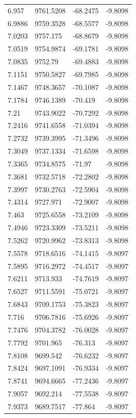 \begin{table}[H]
\begin{tabular}{llll}
6.957 & 9761.5208 & -68.2475 & -9.8098 \\
6.9886 & 9759.3528 & -68.5577 & -9.8098 \\
7.0203 & 9757.175 & -68.8679 & -9.8098 \\
7.0519 & 9754.9874 & -69.1781 & -9.8098 \\
7.0835 & 9752.79 & -69.4883 & -9.8098 \\
7.1151 & 9750.5827 & -69.7985 & -9.8098 \\
7.1467 & 9748.3657 & -70.1087 & -9.8098 \\
7.1784 & 9746.1389 & -70.419 & -9.8098 \\
7.21 & 9743.9022 & -70.7292 & -9.8098 \\
7.2416 & 9741.6558 & -71.0394 & -9.8098 \\
7.2732 & 9739.3995 & -71.3496 & -9.8098 \\
7.3049 & 9737.1334 & -71.6598 & -9.8098 \\
7.3365 & 9734.8575 & -71.97 & -9.8098 \\
7.3681 & 9732.5718 & -72.2802 & -9.8098 \\
7.3997 & 9730.2763 & -72.5904 & -9.8098 \\
7.4314 & 9727.971 & -72.9007 & -9.8098 \\
7.463 & 9725.6558 & -73.2109 & -9.8098 \\
7.4946 & 9723.3309 & -73.5211 & -9.8098 \\
7.5262 & 9720.9962 & -73.8313 & -9.8098 \\
7.5578 & 9718.6516 & -74.1415 & -9.8097 \\
7.5895 & 9716.2972 & -74.4517 & -9.8097 \\
7.6211 & 9713.933 & -74.7619 & -9.8097 \\
7.6527 & 9711.5591 & -75.0721 & -9.8097 \\
7.6843 & 9709.1753 & -75.3823 & -9.8097 \\
7.716 & 9706.7816 & -75.6926 & -9.8097 \\
7.7476 & 9704.3782 & -76.0028 & -9.8097 \\
7.7792 & 9701.965 & -76.313 & -9.8097 \\
7.8108 & 9699.542 & -76.6232 & -9.8097 \\
7.8424 & 9697.1091 & -76.9334 & -9.8097 \\
7.8741 & 9694.6665 & -77.2436 & -9.8097 \\
7.9057 & 9692.214 & -77.5538 & -9.8097 \\
7.9373 & 9689.7517 & -77.864 & -9.8097 \\

\end{tabular}
\end{table}
